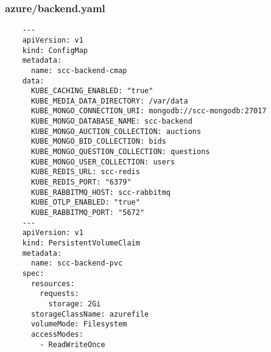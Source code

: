 \documentclass[runningheads]{llncs}
\begin{document}
\subsubsection{azure/backend.yaml}
\begin{verbatim}
    ---
    apiVersion: v1
    kind: ConfigMap
    metadata:
      name: scc-backend-cmap
    data:
      KUBE_CACHING_ENABLED: "true"
      KUBE_MEDIA_DATA_DIRECTORY: /var/data
      KUBE_MONGO_CONNECTION_URI: mongodb://scc-mongodb:27017
      KUBE_MONGO_DATABASE_NAME: scc-backend
      KUBE_MONGO_AUCTION_COLLECTION: auctions
      KUBE_MONGO_BID_COLLECTION: bids
      KUBE_MONGO_QUESTION_COLLECTION: questions
      KUBE_MONGO_USER_COLLECTION: users
      KUBE_REDIS_URL: scc-redis
      KUBE_REDIS_PORT: "6379"
      KUBE_RABBITMQ_HOST: scc-rabbitmq
      KUBE_OTLP_ENABLED: "true"
      KUBE_RABBITMQ_PORT: "5672"
    ---
    apiVersion: v1
    kind: PersistentVolumeClaim
    metadata:
      name: scc-backend-pvc
    spec:
      resources:
        requests:
          storage: 2Gi
      storageClassName: azurefile
      volumeMode: Filesystem
      accessModes:
        - ReadWriteOnce
    

\end{verbatim}
\end{document}
